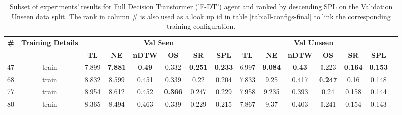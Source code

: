 \begin{table}
\centering
\caption{\label{tab:f_dt_full_dt_ablation_dim}Subset of experiments' results for Full Decision Transformer ('F-DT') agent and ranked by descending SPL on the Validation Unseen data split. The rank in column \# is also used as a look up id in table \ref{tab:all-configs-final} to link the corresponding training configuration.}
\begin{tabular}{@{\hskip3pt}c@{\hskip3pt}c@{\hskip3pt}c@{\hskip3pt}c@{\hskip3pt}c@{\hskip3pt}c@{\hskip3pt}c@{\hskip3pt}c@{\hskip3pt}c@{\hskip3pt}c@{\hskip3pt}c@{\hskip3pt}c@{\hskip3pt}c@{\hskip3pt}c@{\hskip3pt}c}
\toprule
\textbf{\#} & \textbf{Training Details} & \multicolumn{6}{c}{\textbf{Val Seen}} & \multicolumn{6}{c}{\textbf{Val Unseen}} \\
 \textbf{~} &                \textbf{~} &       \textbf{TL} &     \textbf{NE} &  \textbf{nDTW} &     \textbf{OS} &     \textbf{SR} &    \textbf{SPL} &         \textbf{TL} &     \textbf{NE} &  \textbf{nDTW} &     \textbf{OS} &     \textbf{SR} &    \textbf{SPL} \\
\midrule
         47 &                     train &             7.899 &  \textbf{7.881} &  \textbf{0.49} &           0.332 &  \textbf{0.251} &  \textbf{0.233} &               6.997 &  \textbf{9.084} &  \textbf{0.43} &           0.223 &  \textbf{0.164} &  \textbf{0.153} \\
         68 &                     train &             8.832 &           8.599 &          0.451 &           0.339 &            0.22 &           0.204 &               7.833 &            9.25 &          0.417 &  \textbf{0.247} &            0.16 &           0.148 \\
         77 &                     train &             8.954 &           8.612 &          0.452 &  \textbf{0.366} &           0.247 &           0.229 &               7.958 &           9.235 &          0.393 &            0.24 &           0.158 &           0.144 \\
         80 &                     train &             8.365 &           8.494 &          0.463 &           0.339 &           0.229 &           0.215 &               7.867 &            9.37 &          0.403 &           0.241 &           0.154 &           0.143 \\
\bottomrule
\end{tabular}
\end{table}
